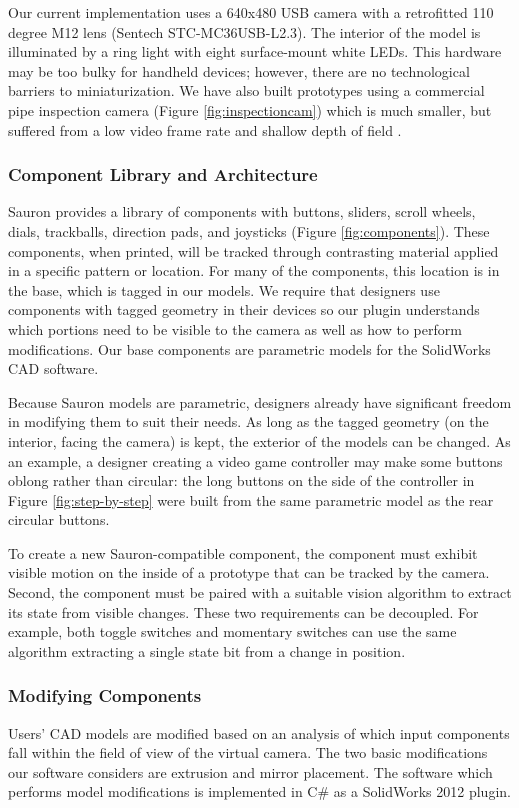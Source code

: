 Our current implementation uses a 640x480 USB camera with a retrofitted 110 degree M12 lens (Sentech STC-MC36USB-L2.3). The interior of the model is illuminated by a ring light with eight surface-mount white LEDs. This hardware may be too bulky for handheld devices; however, there are no technological barriers to miniaturization. We have also built prototypes using a commercial pipe inspection camera (Figure \ref{fig:inspectioncam}) which is much smaller, but suffered from a low video frame rate and shallow depth of field .


\subsubsection{Component Library and Architecture }
Sauron provides a library of components with buttons, sliders, scroll wheels, dials, trackballs, direction pads, and joysticks (Figure \ref{fig:components}).  These components, when printed, will be tracked through contrasting material applied in a specific pattern or location.  For many of the components, this location is in the base, which is tagged in our models.  We require that designers use components with tagged geometry in their devices so our plugin understands which portions need to be visible to the camera as well as how to perform modifications. Our base components are parametric models for the SolidWorks CAD software.

Because Sauron models are parametric, designers already have significant freedom in modifying them to suit their needs.  As long as the tagged geometry (on the interior, facing the camera) is kept, the exterior of the models can be changed.  As an example, a designer creating a video game controller may make some buttons oblong rather than circular: the long buttons on the side of the controller in Figure \ref{fig:step-by-step} were built from the same parametric model as the rear circular buttons.

To create a new Sauron-compatible component, the component must exhibit visible motion on the inside of a prototype that can be tracked by the camera. Second, the component must be paired with a suitable vision algorithm to extract its state from visible changes. These two requirements can be decoupled. 
For example, both toggle switches and momentary switches can use the same algorithm extracting a single state bit from a change in position.

\subsubsection{Modifying Components}
Users' CAD models are modified based on an analysis of which input components fall within the field of view of the virtual camera. The two basic modifications our software considers are extrusion and mirror placement. The software which performs model modifications is implemented in C\# as a SolidWorks 2012 plugin. 

